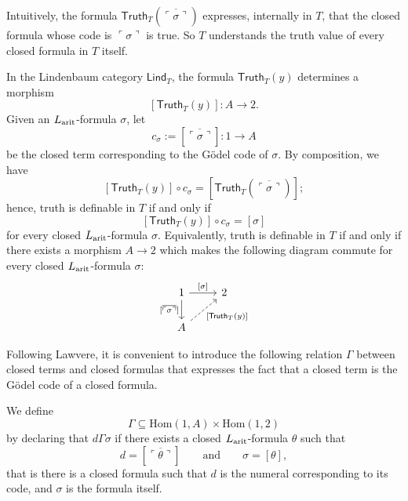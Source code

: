 Intuitively, the formula $\mathsf{Truth}_T(\overline{\ulcorner\sigma\urcorner})$ expresses, internally in $T$, that the closed formula whose code is $\ulcorner\sigma\urcorner$ is true.
So $T$ understands the truth value of every closed formula in $T$ itself.

\begin{remark}
    In the Lindenbaum category $\mathsf{Lind}_T$, the formula $\mathsf{Truth}_T(y)$ determines a morphism
    \[ [\mathsf{Truth}_T(y)]:A\to2. \]
    Given an $L_{\textnormal{arit}}$-formula $\sigma$, let
    \[ c_\sigma := [\overline{\ulcorner\sigma\urcorner}] : 1\to A \]
    be the closed term corresponding to the Gödel code of $\sigma$. By composition, we have
    \[ [\mathsf{Truth}_T(y)]\circ c_\sigma = [\mathsf{Truth}_T(\overline{\ulcorner\sigma\urcorner})]; \]
    hence, truth is definable in $T$ if and only if
    \[ [\mathsf{Truth}_T(y)]\circ c_\sigma = [\sigma] \]
    for every closed $L_{\textnormal{arit}}$-formula $\sigma$. Equivalently, truth is definable in $T$ if and only if there exists a morphism $A \to 2$ which makes the following diagram commute for every closed $L_{\textnormal{arit}}$-formula $\sigma$:
    \[\begin{tikzcd}
        1 & 2 \\
        A
        \arrow["{[\sigma]}", from=1-1, to=1-2]
        \arrow["{[\overline{\ulcorner \sigma \urcorner}]}"', from=1-1, to=2-1]
        \arrow["{[\mathsf{Truth}_T(y)]}"', dashed, from=2-1, to=1-2]
    \end{tikzcd}\]
\end{remark}

Following Lawvere, it is convenient to introduce the following relation $\Gamma$ between closed terms and closed formulas that expresses the fact that a closed term is the Gödel code of a closed formula.

\begin{definition}
    We define
    \[ \Gamma\subseteq\mathrm{Hom}(1,A)\times\mathrm{Hom}(1,2) \]
    by declaring that $d\Gamma\sigma$ if there exists a closed $L_{\textnormal{arit}}$-formula $\theta$ such that
    \[ d = [\overline{\ulcorner\theta\urcorner}] \qquad\text{and}\qquad \sigma = [\theta], \]
    that is there is a closed formula such that $d$ is the numeral corresponding to its code, and $\sigma$ is the formula itself.
\end{definition}

